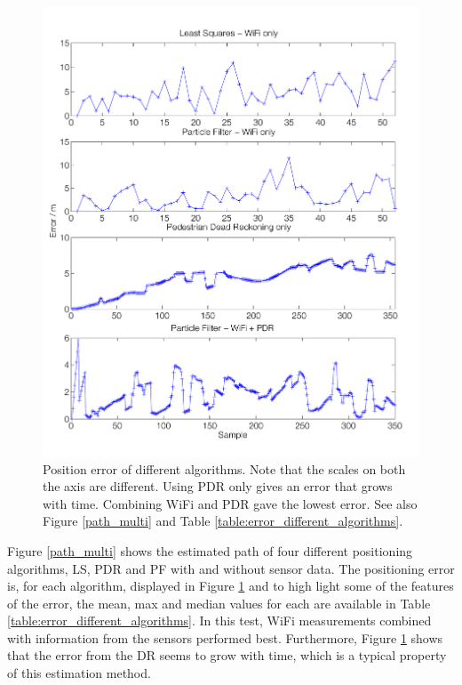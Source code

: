 \documentclass{LTHthesis}
\begin{document}
%
\begin{figure}[!hbt]

\includegraphics[width=1\textwidth ]{images/sensor_fused/error_multi}
\caption{Position error of different algorithms. Note that the scales on both the axis are different. Using PDR only gives an error that grows with time. Combining WiFi and PDR gave the lowest error. See also Figure \ref{path_multi} and Table \ref{table:error_different_algorithms}.}\label{error_multi}
\end{figure}
%
Figure \ref{path_multi} shows the estimated path of four different positioning algorithms, LS, PDR and PF with and without sensor data. The positioning error is, for each algorithm, displayed in Figure \ref{error_multi} and to high light some of the features of the error, the mean, max and median values for each are available in Table \ref{table:error_different_algorithms}. In this test, WiFi measurements combined with information from the sensors performed best. Furthermore, Figure \ref{error_multi} shows that the error from the DR seems to grow with time, which is a typical property of this estimation method. 
%
\end{document}
